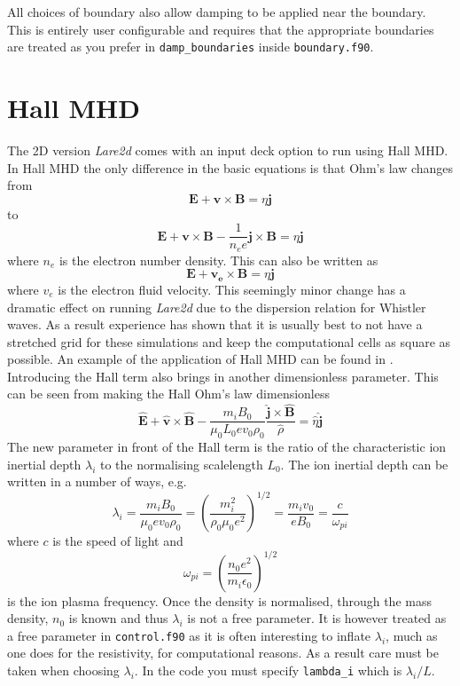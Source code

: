 \documentclass[11pt]{article}
\begin{document}
All choices of boundary also allow damping to be applied near the boundary. This is entirely user configurable and requires that the appropriate boundaries are treated as you prefer in {\tt damp\_boundaries} inside {\tt boundary.f90}.

\section{Hall MHD}
The 2D version {\it Lare2d} comes with an input deck option to run using Hall MHD. In Hall MHD the only difference in the basic equations is that Ohm's law changes from
\begin{displaymath}
\mathbf{E}+\mathbf{v}\times\mathbf{B}=\eta \mathbf{j}
\end{displaymath}
to
\begin{displaymath}
\mathbf{E}+\mathbf{v}\times\mathbf{B}-\frac{1}{n_e e}\mathbf{j}\times\mathbf{B}=\eta \mathbf{j}
\end{displaymath}
where $n_e$ is the electron number density. This can also be written as
\begin{displaymath}
\mathbf{E}+\mathbf{v_e}\times\mathbf{B}=\eta \mathbf{j}
\end{displaymath}
where $v_e$ is the electron fluid velocity. This seemingly minor change has a dramatic effect on running {\it Lare2d} due to the dispersion relation for Whistler waves. As a result experience has shown that it is usually best to not have a stretched grid for these simulations and keep the computational cells as square as possible. An example of the application of Hall MHD can be found in \cite{hall}. Introducing the Hall term also brings in another dimensionless parameter. This can be seen from making the Hall Ohm's law dimensionless
\begin{displaymath}
\hat{\mathbf{E}}+\hat{\mathbf{v}}\times\hat{\mathbf{B}}-\frac{m_iB_0}{\mu_0 L_0 e v_0 \rho_0} \frac{\hat{\mathbf{j}}\times\hat{\mathbf{B}}}{\hat{\rho}}=\hat{\eta} \hat{\mathbf{j}}
\end{displaymath}
The new parameter in front of the Hall term is the ratio of the characteristic ion inertial depth $\lambda_i$ to the normalising scalelength $L_0$. The ion inertial depth can be written in a number of ways, e.g.
\begin{displaymath}
\lambda_i=\frac{m_i B_0}{\mu_0 e v_0 \rho_0} =\left(\frac{m_i^2}{\rho_0\mu_0e^2}\right)^{1/2}=\frac{m_i v_0}{e B_0}=\frac{c}{\omega_{pi} }
\end{displaymath}
where $c$ is the speed of light and
\begin{displaymath}
\omega_{pi}=\left(\frac{n_0 e^2}{m_i \epsilon_0}\right)^{1/2}
\end{displaymath}
is the ion plasma frequency. Once the density is normalised, through the mass density, $n_0$ is known and thus $\lambda_i$ is not a free parameter. It is however treated as a free parameter in \texttt{control.f90} as it is often interesting to inflate $\lambda_i$, much as one does for the resistivity, for computational reasons. As a result care must be taken when choosing $\lambda_i$. In the code you must specify {\tt lambda\_i} which is $\lambda_i/L$.
\end{document}
